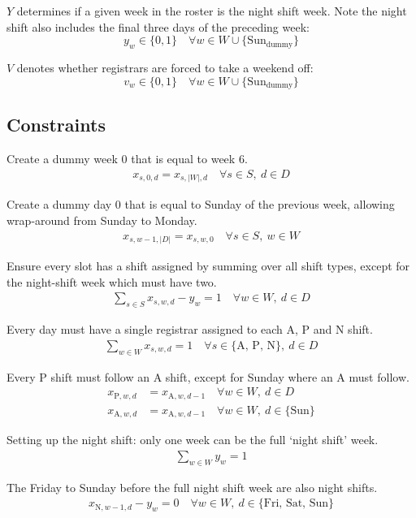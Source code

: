 \documentclass[a4paper]{article}
\begin{document}
$Y$ determines if a given week in the roster is the night shift week. Note the night shift also includes the final three days of the preceding week:
$$y_w \in \{0, 1\} \quad\forall w\in W \cup \{\text{Sun}_\text{dummy}\}$$

$V$ denotes whether registrars are forced to take a weekend off:
$$v_w \in \{0, 1\} \quad\forall w\in W \cup \{\text{Sun}_\text{dummy}\}$$

\subsection{Constraints}

Create a dummy week 0 that is equal to week 6.
\begin{align}
  x_{s, 0, d} = x_{s, |W|, d} \quad\forall s\in S,\ d\in D
\end{align}

Create a dummy day 0 that is equal to Sunday of the previous week, allowing wrap-around from Sunday to Monday.
\begin{align}
  x_{s, w-1, |D|} = x_{s, w, 0} \quad\forall s\in S,\ w\in W
\end{align}

Ensure every slot has a shift assigned by summing over all shift types, except for the night-shift week which must have two.
\begin{align}
  \sum_{s\in S} x_{s, w, d} - y_w = 1 \quad\forall w\in W,\ d\in D
\end{align}

Every day must have a single registrar assigned to each A, P and N shift.
\begin{align}
  \sum_{w\in W} x_{s, w, d} = 1 \quad\forall s\in \{\text{A, P, N}\},\ d\in D
\end{align}

Every P shift must follow an A shift, except for Sunday where an A must follow.
\begin{align}
  x_{\text{P}, w, d} &= x_{\text{A}, w, d-1} \quad\forall w\in W,\ d\in D\\
  x_{\text{A}, w, d} &= x_{\text{A}, w, d-1} \quad\forall w\in W,\ d\in \{\text{Sun}\}
\end{align}

Setting up the night shift: only one week can be the full `night shift' week.
\begin{align}
  \sum_{w\in W} y_w = 1
\end{align}

The Friday to Sunday before the full night shift week are also night shifts.
\begin{align}
  x_{\text{N}, w-1, d} - y_w = 0 \quad\forall w\in W,\ d\in \{\text{Fri, Sat, Sun}\}
\end{align}
\end{document}
